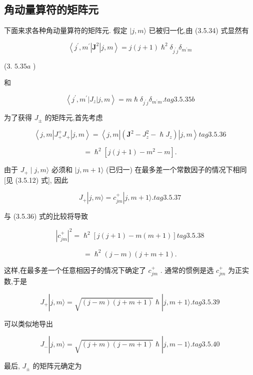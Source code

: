 \subsection{角动量算符的矩阵元}
下面来求各种角动量算符的矩阵元. 假定 $|j, m\rangle$ 已被归一化,由 (3.5.34) 式显然有

$$
\left\langle {{j}^{\prime },{m}^{\prime }\left| {\mathbf{J}}^{2}\right| j, m}\right\rangle = j\left( {j + 1}\right) {\hslash }^{2}{\delta }_{{j}^{\prime }j}{\delta }_{{m}^{\prime }m}
$$

(3. ${5.35a}$ )

和

$$
\left\langle {{j}^{\prime },{m}^{\prime }\left| {J}_{z}\right| j, m}\right\rangle = m\hslash {\delta }_{{j}^{\prime }j}{\delta }_{{m}^{\prime }m}. tag{3. 5.35b}
$$

为了获得 ${J}_{ \pm }$ 的矩阵元,首先考虑

$$
\left\langle {j, m\left| {{J}_{ + }^{ + }{J}_{ + }}\right| j, m}\right\rangle = \left\langle {j, m\left| \left( {{\mathbf{J}}^{2} - {J}_{z}^{2} - \hslash {J}_{z}}\right) \right| j, m}\right\rangle tag{3. 5.36}
$$

$$
= {\hslash }^{2}\left\lbrack {j\left( {j + 1}\right) - {m}^{2} - m}\right\rbrack .
$$

由于 ${J}_{ + } \mid j, m\rangle$ 必须和 $|j, m + 1\rangle$ (已归一) 在最多差一个常数因子的情况下相同 [见 (3.5.12) 式], 因此

$$
{J}_{ + }\left| {j, m\rangle = {c}_{jm}^{ + }}\right| j, m + 1\rangle . tag{3. 5.37}
$$

与 (3.5.36) 式的比较将导致

$$
{\left| {c}_{jm}^{ + }\right| }^{2} = {\hslash }^{2}\left\lbrack {j\left( {j + 1}\right) - m\left( {m + 1}\right) }\right\rbrack tag{3. 5.38}
$$

$$
= {\hslash }^{2}\left( {j - m}\right) \left( {j + m + 1}\right) \text{.}
$$

这样,在最多差一个任意相因子的情况下确定了 ${c}_{jm}^{ + }$ . 通常的惯例是选 ${c}_{jm}^{ + }$ 为正实数,于是

$$
{J}_{ + }\left| {j, m\rangle = \sqrt{\left( {j - m}\right) \left( {j + m + 1}\right) }\hslash }\right| j, m + 1\rangle . tag{3.5.39}
$$

可以类似地导出

$$
{J}_{ - }\left| {j, m\rangle = \sqrt{\left( {j + m}\right) \left( {j - m + 1}\right) }\hslash }\right| j, m - 1\rangle . tag{3. 5.40}
$$

最后, ${J}_{ \pm }$ 的矩阵元确定为

